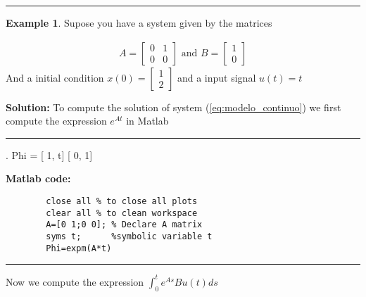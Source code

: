 \documentclass[nols]{tufte-handout}
\theoremstyle{definition}
\newtheorem{exmp}{Example}[section]
\begin{document}
\vspace{1cm}
\hrule height 1pt
\begin{exmp}
    
    Supose you have a system given by the matrices

    \begin{align*}
        A=\begin{bmatrix}
            0 & 1\\
            0 & 0  
        \end{bmatrix}\text{ and }
        B=\begin{bmatrix}
            1\\0
        \end{bmatrix}
    \end{align*}
    And a initial condition $x(0)=\begin{bmatrix} 1\\2\end{bmatrix}$ and a input signal $u(t)=t$

    \textbf{Solution:}
    To compute the solution of system (\ref{eq:modelo_continuo}) we first compute the expression $e^{At}$ in Matlab

    \noindent\hfil\rule{\textwidth}{.4pt}\hfil 
    \begin{verbbox}[\footnotesize]
                                                            .           
Phi =
[ 1, t]
[ 0, 1]    
    \end{verbbox}

    \textbf{Matlab code:}
 
    \begin{verbatim}
        close all % to close all plots
        clear all % to clean workspace
        A=[0 1;0 0]; % Declare A matrix
        syms t;      %symbolic variable t
        Phi=expm(A*t)
    \end{verbatim}
    \noindent\hfil\rule{\textwidth}{.4pt}\hfil 
    Now we compute the expression $\displaystyle\int_0^t e^{As}Bu(t)ds$
    

\end{exmp}
\end{document}
